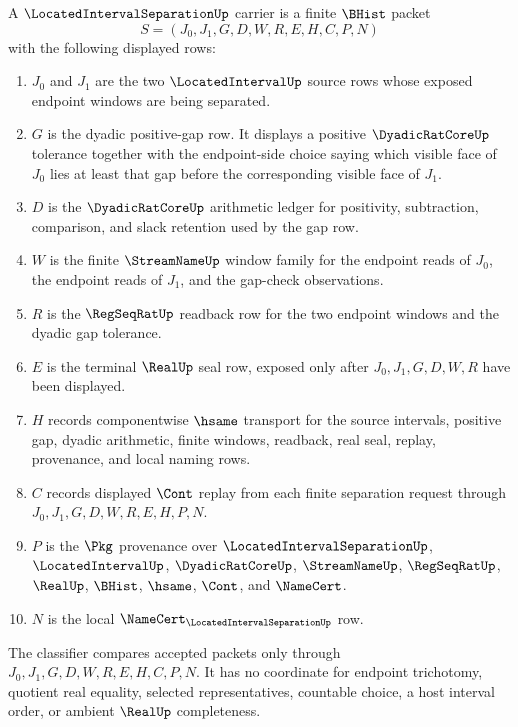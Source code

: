\begin{definition}
\label{def:located-interval-separation-carrier}
A $\LocatedIntervalSeparationUp$ carrier is a finite $\BHist$ packet
$$
S=(J_0,J_1,G,D,W,R,E,H,C,P,N)
$$
with the following displayed rows:
\begin{enumerate}
\item $J_0$ and $J_1$ are the two $\LocatedIntervalUp$ source rows whose exposed endpoint windows are being separated.
\item $G$ is the dyadic positive-gap row. It displays a positive $\DyadicRatCoreUp$ tolerance together with the endpoint-side choice saying which visible face of $J_0$ lies at least that gap before the corresponding visible face of $J_1$.
\item $D$ is the $\DyadicRatCoreUp$ arithmetic ledger for positivity, subtraction, comparison, and slack retention used by the gap row.
\item $W$ is the finite $\StreamNameUp$ window family for the endpoint reads of $J_0$, the endpoint reads of $J_1$, and the gap-check observations.
\item $R$ is the $\RegSeqRatUp$ readback row for the two endpoint windows and the dyadic gap tolerance.
\item $E$ is the terminal $\RealUp$ seal row, exposed only after $J_0,J_1,G,D,W,R$ have been displayed.
\item $H$ records componentwise $\hsame$ transport for the source intervals, positive gap, dyadic arithmetic, finite windows, readback, real seal, replay, provenance, and local naming rows.
\item $C$ records displayed $\Cont$ replay from each finite separation request through $J_0,J_1,G,D,W,R,E,H,P,N$.
\item $P$ is the $\Pkg$ provenance over $\LocatedIntervalSeparationUp$, $\LocatedIntervalUp$, $\DyadicRatCoreUp$, $\StreamNameUp$, $\RegSeqRatUp$, $\RealUp$, $\BHist$, $\hsame$, $\Cont$, and $\NameCert$.
\item $N$ is the local $\NameCert_{\LocatedIntervalSeparationUp}$ row.
\end{enumerate}
The classifier compares accepted packets only through $J_0,J_1,G,D,W,R,E,H,C,P,N$. It has no coordinate for endpoint trichotomy, quotient real equality, selected representatives, countable choice, a host interval order, or ambient $\RealUp$ completeness.
\end{definition}

